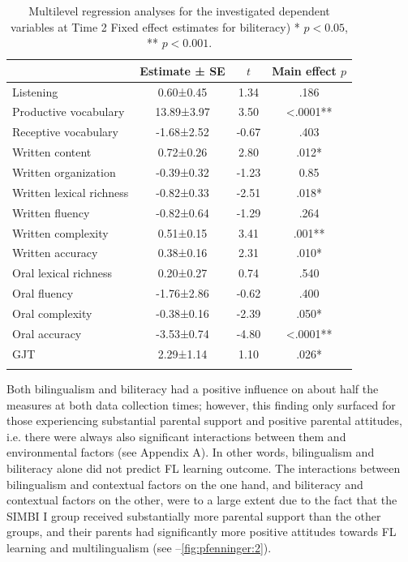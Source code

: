 \documentclass[output=paper,modfonts,nonflat,newtxmath]{langsci/langscibook}
\begin{document}
\begin{table}
	\caption{\label{tab:pfenninger:9} Multilevel regression analyses for the investigated dependent variables at Time 2 Fixed effect estimates for biliteracy) * $p <0.05$, ** $p <0.001$.}
	\begin{tabular}{lS[table-format=-1.3,parse-numbers=false]S[table-format=-1.2]S[table-format=<1.4]}
		\lsptoprule
		& {Estimate ± SE} & {$t$}  & {Main effect $p$}\\\midrule
		Listening  & 0.60±0.45 & 1.34 & .186\\
		Productive vocabulary & 13.89±3.97 & 3.50 & <.0001**\\
		Receptive vocabulary & -1.68±2.52 & -0.67 & .403\\
		Written content & 0.72±0.26 & 2.80 & .012*\\
		Written organization & -0.39±0.32 & -1.23 & 0.85\\
		Written lexical richness & -0.82±0.33 & -2.51 & .018*\\
		Written fluency & -0.82±0.64 & -1.29 & .264\\
		Written complexity & 0.51±0.15 & 3.41 & .001**\\
		Written accuracy & 0.38±0.16 & 2.31 & .010*\\
		Oral lexical richness & 0.20±0.27 & 0.74 & .540\\
		Oral fluency & -1.76±2.86 & -0.62 & .400\\
		Oral complexity & -0.38±0.16 & -2.39 & .050*\\
		Oral accuracy & -3.53±0.74 & -4.80 & <.0001**\\
		GJT & 2.29±1.14 & 1.10 & .026*\\
		\lspbottomrule
	\end{tabular}
\end{table}

Both bilingualism and biliteracy had a positive influence on about half the measures at both data collection times; however, this finding only surfaced for those experiencing substantial parental support and positive parental attitudes, i.e. there were always also significant interactions between them and environmental factors (see Appendix A). In other words, bilingualism and biliteracy alone did not predict FL learning outcome. The interactions between bilingualism and contextual factors on the one hand, and biliteracy and contextual factors on the other, were to a large extent due to the fact that the SIMBI I group received substantially more parental support than the other groups, and their parents had significantly more positive attitudes towards FL learning and multilingualism (see --\ref{fig:pfenninger:2}).%
\end{document}
